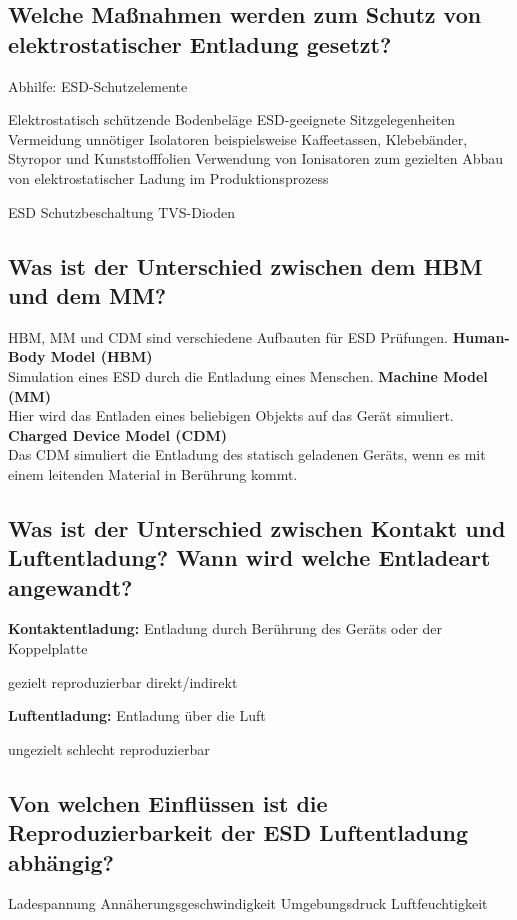 \subsection{Welche Maßnahmen werden zum Schutz von elektrostatischer Entladung gesetzt?}
Abhilfe: ESD-Schutzelemente
\begin{outline}
  \1 Elektrostatisch schützende Bodenbeläge
  \1 ESD-geeignete Sitzgelegenheiten
  \1 Vermeidung unnötiger Isolatoren beispielsweise Kaffeetassen, Klebebänder, Styropor und Kunststofffolien
  \1 Verwendung von Ionisatoren zum gezielten Abbau von elektrostatischer Ladung im Produktionsprozess
\end{outline}

\begin{outline}
  \1 ESD Schutzbeschaltung TVS-Dioden
\end{outline}

\subsection{Was ist der Unterschied zwischen dem HBM und dem MM?}
HBM, MM und CDM sind verschiedene Aufbauten für ESD Prüfungen.\p
%
\textbf{Human-Body Model (HBM)}\\
Simulation eines ESD durch die Entladung eines Menschen.\p
%
\textbf{Machine Model (MM)}\\
Hier wird das Entladen eines beliebigen Objekts auf das Gerät simuliert.\p
%
\textbf{Charged Device Model (CDM)}\\
Das CDM simuliert die Entladung des statisch geladenen Geräts, wenn es mit einem leitenden Material in Berührung kommt.\p

\subsection{Was ist der Unterschied zwischen Kontakt und Luftentladung? Wann wird welche Entladeart angewandt?}
\textbf{Kontaktentladung:}
Entladung durch Berührung des Geräts oder der Koppelplatte
%
\begin{outline}
  \1 gezielt
  \1 reproduzierbar
  \1 direkt/indirekt
\end{outline}
%
\textbf{Luftentladung:}
Entladung über die Luft
%
\begin{outline}
  \1 ungezielt
  \1 schlecht reproduzierbar
\end{outline}

\subsection{Von welchen Einflüssen ist die Reproduzierbarkeit der ESD Luftentladung abhängig?}
\begin{outline}
  \1 Ladespannung
  \1 Annäherungsgeschwindigkeit
  \1 Umgebungsdruck
  \1 Luftfeuchtigkeit
\end{outline}

